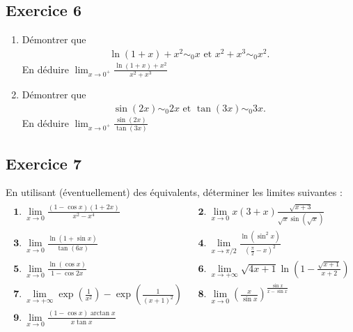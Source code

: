 \documentclass[letterpaper,10pt,french]{jupyterBook}
\begin{document}
\subsection{Exercice 6}
\label{\detokenize{exo6:exercice-6}}\begin{enumerate}
%
\item {} 
\sphinxAtStartPar
Démontrer que
\begin{equation*}
\begin{split}
    \ln(1+x)+x^2\sim_0 x\textrm{ et }x^2+x^3\sim_0 x^2.
    \end{split}
\end{equation*}
\sphinxAtStartPar
En déduire \(\displaystyle \lim_{x\to 0^+}\frac{\ln(1+x)+x^2}{x^2+x^3}\)

\item {} 
\sphinxAtStartPar
Démontrer que
\begin{equation*}
\begin{split}
    \sin(2x)\sim_0 2x\textrm{ et }\tan(3x)\sim_0 3x.
    \end{split}
\end{equation*}
\sphinxAtStartPar
En déduire \(\displaystyle \lim_{x\to 0^+}\frac{\sin(2x)}{\tan(3x)}\)

\end{enumerate}


\subsection{Exercice 7}
\label{\detokenize{exo6:exercice-7}}
\sphinxAtStartPar
En utilisant (éventuellement) des équivalents, déterminer les limites suivantes :
\begin{equation*}
\begin{split}
\begin{array}{lcl}
\displaystyle \mathbf 1.\ \lim_{x\to 0}\frac{(1-\cos x)(1+2x)}{x^2-x^4}&&\displaystyle \mathbf 2.\ \lim_{x\to 0}x(3+x)\frac{\sqrt{x+3}}{\sqrt x\sin(\sqrt x)}\\
\displaystyle \mathbf 3.\ \lim_{x\to 0}\frac{\ln (1+\sin x)}{\tan(6x)}&&
\displaystyle \mathbf 4.\ \lim_{x\to\pi/2}\frac{\ln(\sin^2 x)}{\left(\frac{\pi}{2}-x\right)^2}\\
\displaystyle \mathbf 5.\ \lim_{x\to 0}\frac{\ln(\cos x)}{1-\cos 2x}&&\displaystyle \mathbf 6.\ \lim_{x\to+\infty}\sqrt{4x+1}\ln\left(1-\frac{\sqrt{x+1}}{x+2}\right)\\
\displaystyle \mathbf 7.\ \lim_{x\to+\infty}\exp\left(\frac1{x^2}\right)-
\exp\left(\frac{1}{(x+1)^2}\right)
&&\displaystyle \mathbf 8.\ \lim_{x\to 0}\left(\frac{x}{\sin x}\right)^{\frac{\sin x}{x-\sin x}}\\\displaystyle \mathbf 9.\ \lim_{x\to 0}\frac{(1-\cos x)\arctan x}{x\tan x}
\end{array}\end{split}
\end{equation*}
\end{document}
